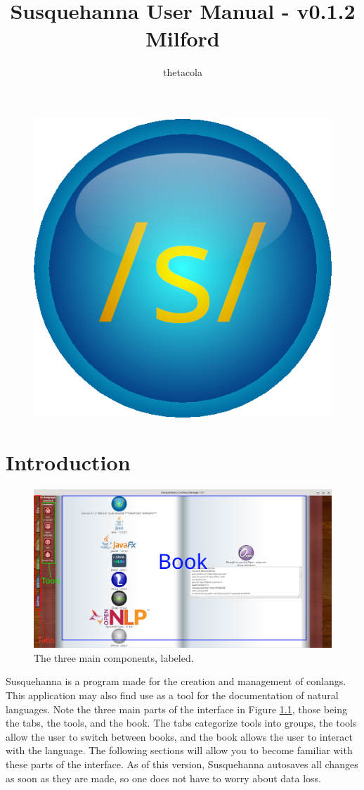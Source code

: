 \documentclass{report}
\title{Susquehanna User Manual - v0.1.2 Milford}
\author{thetacola}
\begin{document}
	\begin{figure}
		\centering
		\includegraphics[width=0.7\linewidth]{img/logo}
	\end{figure}
	\maketitle
	\tableofcontents
	\chapter{Introduction}
	\begin{figure}[ht]
		\centering
		\includegraphics[width=1\linewidth]{img/diagram}
		\caption{The three main components, labeled.}
		\label{fig:tabs-diagram-1}
	\end{figure}
	\par
	Susquehanna is a program made for the creation and management of conlangs. This application may also find use as a tool for the documentation of natural languages. Note the three main parts of the interface in Figure \ref{fig:tabs-diagram-1}, those being the tabs, the tools, and the book. The tabs categorize tools into groups, the tools allow the user to switch between books, and the book allows the user to interact with the language. The following sections will allow you to become familiar with these parts of the interface. As of this version, Susquehanna autosaves all changes as soon as they are made, so one does not have to worry about data loss.
\end{document}
